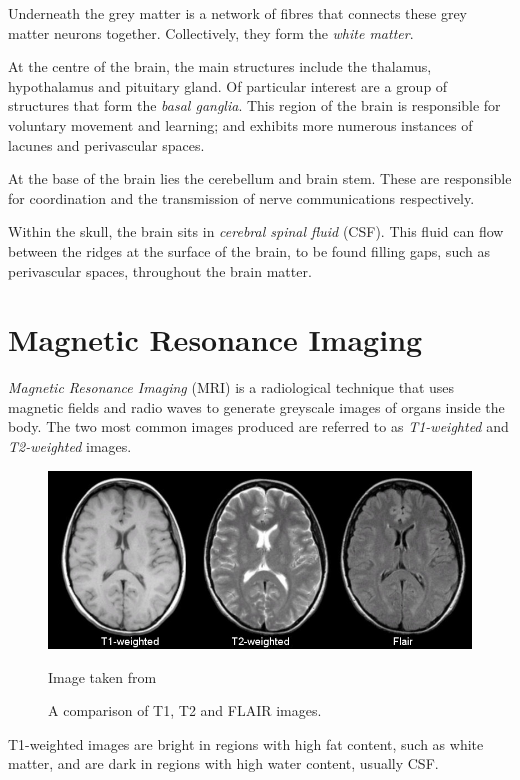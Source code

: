 Underneath the grey matter is a network of fibres that connects these grey matter neurons together. Collectively, they form the \textit{white matter}. 

At the centre of the brain, the main structures include the thalamus, hypothalamus and pituitary gland. Of particular interest are a group of structures that form the \textit{basal ganglia}. This region of the brain is responsible for voluntary movement and learning; and exhibits more numerous instances of lacunes and perivascular spaces.

At the base of the brain lies the cerebellum and brain stem. These are responsible for coordination and the transmission of nerve communications respectively.

Within the skull, the brain sits in \textit{cerebral spinal fluid} (CSF). This fluid can flow between the ridges  at the surface of the brain, to be found filling gaps, such as perivascular spaces, throughout the brain matter.


\section{Magnetic Resonance Imaging}\label{svd-MRI}

\textit{Magnetic Resonance Imaging }(MRI) is a radiological technique that uses magnetic fields and radio waves to generate greyscale images of organs inside the body. The two most common images produced are referred to as \textit{T1-weighted} and \textit{T2-weighted} images.

\begin{figure}[ht]
	\centering
	\includegraphics[width=\textwidth]{Images/2_t1_t2_flair.jpg}
	\caption{A comparison of T1, T2 and FLAIR images.}
	\small Image taken from \cite{Preston2006}
\end{figure}

T1-weighted images are bright in regions with high fat content, such as white matter, and are dark in regions with high water content, usually CSF.

